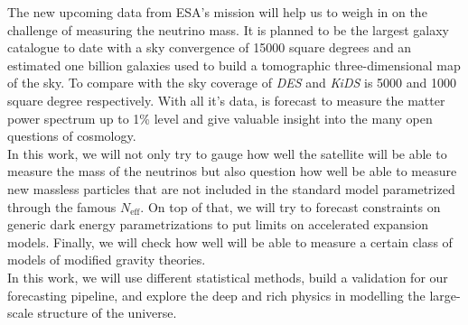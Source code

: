 \documentclass[../main.tex]{subfiles}
\begin{document}
The new upcoming data from ESA's \Euclid mission will help us to weigh in on the challenge of measuring the neutrino mass. It is planned to be the largest galaxy catalogue to date with a sky convergence of 15000 square degrees and an estimated one billion galaxies used to build a tomographic three-dimensional map of the sky. To compare with the sky coverage of {\it DES} and {\it KiDS} is 5000 and 1000 square degree respectively. With all it's data, \Euclid is forecast to measure the matter power spectrum up to 1\% level and give valuable insight into the many open questions of cosmology.\\
In this work, we will not only try to gauge how well the \Euclid satellite will be able to measure the mass of the neutrinos but also question how well \Euclid be able to measure new massless particles that are not included in the standard model parametrized through the famous $N_\mathrm{eff}$. On top of that, we will try to forecast constraints on generic dark energy parametrizations to put limits on accelerated expansion models. Finally, we will check how well \Euclid will be able to measure a certain class of models of modified gravity theories. \\
In this work, we will use different statistical methods, build a validation for our forecasting pipeline, and explore the deep and rich physics in modelling the large-scale structure of the universe.
\end{document}
